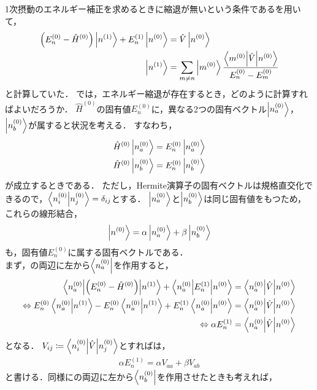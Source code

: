 \documentclass{report}
\begin{document}
  1次摂動のエネルギー補正を求めるときに縮退が無いという条件であるを用いて，
  \begin{align}
    \qty(E_n^{(0)} - \hat{H}^{(0)})\ket{n^{(1)}} + E_n^{(1)}\ket{n^{(0)}} &= \hat{V}\ket{n^{(0)}} \label{1st-order-perturbation-re-before} \\
    \ket{n^{(1)}} &= \sum_{m\neq n}\ket{m^{(0)}}\frac{\mel**{m^{(0)}}{\hat{V}}{n^{(0)}}}{E_n^{(0)} - E_m^{(0)}}\label{1st-order-perturbation-re-after}
  \end{align}
  と計算していた．
  では，エネルギー縮退が存在するとき，どのように計算すればよいだろうか．
  $\hat{H}^{(0)}$の固有値$E_n^{(0)}$に，異なる2つの固有ベクトル$\ket{n_a^{(0)}}$，$\ket{n_b^{(0)}}$が属すると状況を考える．
  すなわち，
  \begin{align}
    \hat{H}^{(0)}\ket{n_a^{(0)}} &= E_n^{(0)}\ket{n_a^{(0)}} \\
    \hat{H}^{(0)}\ket{n_b^{(0)}} &= E_n^{(0)}\ket{n_b^{(0)}}
  \end{align}
  が成立するときである．
  ただし，Hermite演算子の固有ベクトルは規格直交化できるので，$\braket{n_i^{(0)}}{n_j^{(0)}} = \delta_{ij}$とする．
  $\ket{n_a^{(0)}}$と$\ket{n_b^{(0)}}$は同じ固有値をもつため，これらの線形結合，
  \begin{align}
    \ket{n^{(0)}} = \alpha\ket{n_a^{(0)}} + \beta\ket{n_b^{(0)}}\label{degeneracy-n0-def}
  \end{align}
  も，固有値$E_n^{(0)}$に属する固有ベクトルである．\\
  まず，の両辺に左から$\bra{n_a^{(0)}}$を作用すると，
  \begin{align}
    \mel**{n_a^{(0)}}{\qty(E_n^{(0)} - \hat{H}^{(0)})}{n^{(1)}} + \mel**{n_a^{(0)}}{E_n^{(1)}}{n^{(0)}} &= \mel**{n_a^{(0)}}{\hat{V}}{n^{(0)}} \\ 
    \Leftrightarrow E_n^{(0)}\braket{n_a^{(0)}}{n^{(1)}} - E_n^{(0)}\braket{n_a^{(0)}}{n^{(1)}} + E_n^{(1)}\braket{n_a^{(0)}}{n^{(0)}} &= \mel**{n_a^{(0)}}{\hat{V}}{n^{(0)}} \\ 
    \Leftrightarrow \alpha E_n^{(1)} &= \mel**{n_a^{(0)}}{\hat{V}}{n^{(0)}}\label{degeneracy-ket-alpha}
  \end{align}
  となる．
  $V_{ij} \coloneqq \mel**{n^{(0)}_i}{\hat{V}}{n^{(0)}_j}$とすればは，
  \begin{align}
    \alpha E_n^{(1)} = \alpha V_{aa} + \beta V_{ab}
  \end{align}
  と書ける．同様にの両辺に左から$\bra{n_b^{(0)}}$を作用させたときも考えれば，
\end{document}

